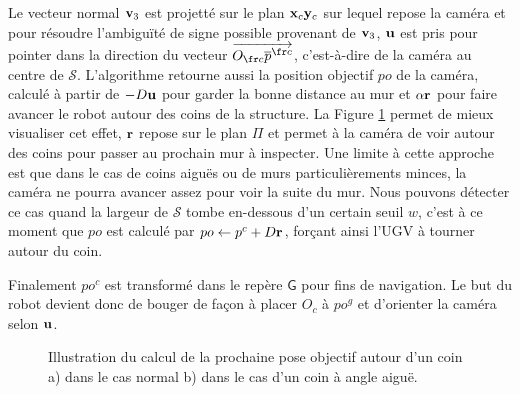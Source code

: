 Le vecteur normal $\mathbf{v}_3$ est projetté sur le plan $\mathbf{x}_c\mathbf{y}_c$ sur lequel repose la caméra et pour résoudre l'ambiguïté de signe possible provenant de $\mathbf{v}_3$, $\mathbf{u}$ est pris pour pointer dans la direction du vecteur $\overrightarrow{O_{\fr c} \overline{p}^{\fr c}}$, c'est-à-dire de la caméra au centre de $\mathcal{S}$. L'algorithme retourne aussi la position objectif ${po}$ de la caméra, calculé à partir de $-D\mathbf{u}$ pour garder la bonne distance au mur et $\alpha \mathbf{r}$ pour faire avancer le robot autour des coins de la structure. La Figure \ref{fig:ugv_goal_determination} permet de mieux visualiser cet effet, $\mathbf{r}$ repose sur le plan $\Pi$ et permet à la caméra de voir autour des coins pour passer au prochain mur à inspecter. Une limite à cette approche est que dans le cas de coins aiguës ou de murs particulièrements minces, la caméra ne pourra avancer assez pour voir la suite du mur. Nous pouvons détecter ce cas quand la largeur de $\mathcal{S}$ tombe en-dessous d'un certain seuil $w$, c'est à ce moment que ${po}$ est calculé par ${po} \gets p^c + D \mathbf{r}$, forçant ainsi l'UGV à tourner autour du coin.

Finalement ${po^c}$ est transformé dans le repère $\mathsf{G}$ pour fins de navigation. Le but du robot devient donc de bouger de façon à placer $O_c$ à ${po^g}$ et d'orienter la caméra selon $\mathbf{u}$.

\begin{figure}[ht]
  \centering
  \hfil
  \caption{
    Illustration du calcul de la prochaine pose objectif autour d'un coin a) dans le cas normal b) dans le cas d'un coin à angle aiguë.
  }
  \label{fig:ugv_goal_determination}
\end{figure}

